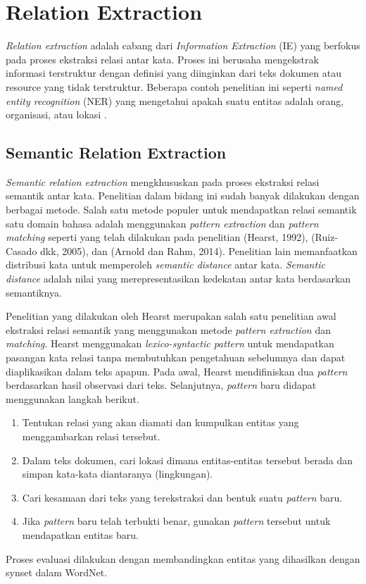 \section{Relation Extraction}
\textit{Relation extraction} adalah cabang dari \textit{Information Extraction} (IE) yang berfokus pada proses ekstraksi relasi antar kata. Proses ini berusaha mengekstrak informasi terstruktur dengan definisi yang diinginkan dari teks dokumen atau resource yang tidak terstruktur. Beberapa contoh penelitian ini seperti \textit{named entity recognition} (NER) yang mengetahui apakah suatu entitas adalah orang, organisasi, atau lokasi \citep{paper.bikel}. 

\subsection{Semantic Relation Extraction}
\textit{Semantic relation extraction} mengkhususkan pada proses ekstraksi relasi semantik antar kata. Penelitian dalam bidang ini sudah banyak dilakukan dengan berbagai metode. Salah satu metode populer untuk mendapatkan relasi semantik satu domain bahasa adalah menggunakan \textit{pattern extraction} dan \textit{pattern matching} seperti yang telah dilakukan pada penelitian (Hearst, 1992), (Ruiz-Casado dkk, 2005), dan (Arnold dan Rahm, 2014). Penelitian lain memanfaatkan distribusi kata untuk memperoleh \textit{semantic distance} antar kata. \textit{Semantic distance} adalah nilai yang merepresentasikan kedekatan antar kata berdasarkan semantiknya.

Penelitian yang dilakukan oleh Hearst merupakan salah satu penelitian awal ekstraksi relasi semantik yang menggunakan metode \textit{pattern extraction} dan \textit{matching}. Hearst menggunakan \textit{lexico-syntactic pattern} untuk mendapatkan pasangan kata relasi tanpa membutuhkan pengetahuan sebelumnya dan dapat diaplikasikan dalam teks apapun. Pada awal, Hearst mendifiniskan dua \textit{pattern} berdasarkan hasil observasi dari teks. Selanjutnya, \textit{pattern} baru didapat menggunakan langkah berikut. 
\begin{enumerate}
  \item Tentukan relasi yang akan diamati dan kumpulkan entitas yang menggambarkan relasi tersebut.
  \item Dalam teks dokumen, cari lokasi dimana entitas-entitas tersebut berada dan simpan kata-kata diantaranya (lingkungan).
  \item Cari kesamaan dari teks yang terekstraksi dan bentuk suatu \textit{pattern} baru.
  \item Jika \textit{pattern} baru telah terbukti benar, gunakan \textit{pattern} tersebut untuk mendapatkan entitas baru.
\end{enumerate}
Proses evaluasi dilakukan dengan membandingkan entitas yang dihasilkan dengan synset dalam WordNet. 

